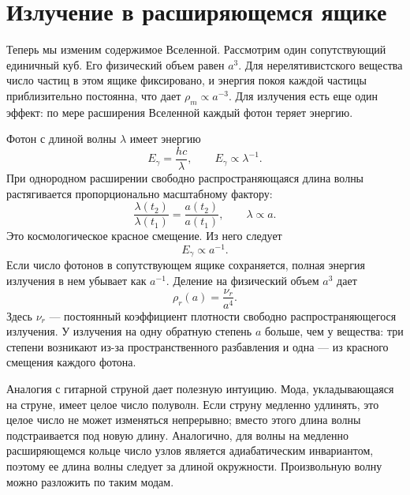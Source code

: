 \section{Излучение в расширяющемся ящике}

Теперь мы изменим содержимое Вселенной. Рассмотрим один сопутствующий единичный куб. Его физический объем равен \(a^3\). Для нерелятивистского вещества число частиц в этом ящике фиксировано, и энергия покоя каждой частицы приблизительно постоянна, что дает \(\rho_m\propto a^{-3}\). Для излучения есть еще один эффект: по мере расширения Вселенной каждый фотон теряет энергию.

Фотон с длиной волны \(\lambda\) имеет энергию
\begin{equation}
E_\gamma=\frac{hc}{\lambda},
\qquad
E_\gamma\propto\lambda^{-1}.
\label{eq:c02-photon-energy}
\end{equation}
При однородном расширении свободно распространяющаяся длина волны растягивается пропорционально масштабному фактору:
\begin{equation}
\frac{\lambda(t_2)}{\lambda(t_1)}
=\frac{a(t_2)}{a(t_1)},
\qquad
\lambda\propto a.
\label{eq:c02-redshift}
\end{equation}
Это космологическое красное смещение. Из него следует
\begin{equation}
E_\gamma\propto a^{-1}.
\label{eq:c02-photon-redshift}
\end{equation}
Если число фотонов в сопутствующем ящике сохраняется, полная энергия излучения в нем убывает как \(a^{-1}\). Деление на физический объем \(a^3\) дает
\begin{equation}
\boxed{\rho_r(a)=\frac{\nu_r}{a^4}.}
\label{eq:c02-radiation-density}
\end{equation}
Здесь \(\nu_r\) — постоянный коэффициент плотности свободно распространяющегося излучения. У излучения на одну обратную степень \(a\) больше, чем у вещества: три степени возникают из-за пространственного разбавления и одна — из красного смещения каждого фотона.

Аналогия с гитарной струной дает полезную интуицию. Мода, укладывающаяся на струне, имеет целое число полуволн. Если струну медленно удлинять, это целое число не может изменяться непрерывно; вместо этого длина волны подстраивается под новую длину. Аналогично, для волны на медленно расширяющемся кольце число узлов является адиабатическим инвариантом, поэтому ее длина волны следует за длиной окружности. Произвольную волну можно разложить по таким модам.

